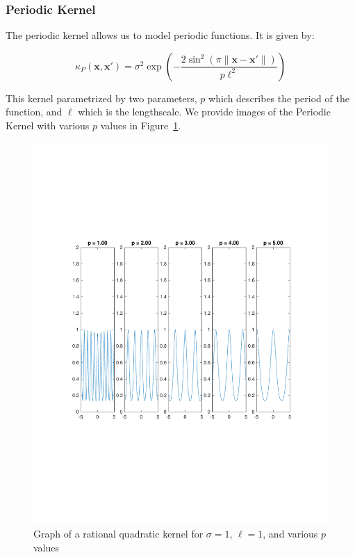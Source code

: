 \documentclass{article}
\newcommand{\bx}{\boldsymbol{x}}
\begin{document}
\subsubsection{Periodic Kernel}

The periodic kernel allows us to model periodic functions. It is given by: 

\[
  \kappa_{P}(\bx, \bx') = \sigma^{2} \exp\left(- \frac{2 \sin^{2}(\pi \|\bx - \bx'\|)}{p \ell^{2}}\right)
\]

This kernel parametrized by two parameters, $p$ which describes the period of the function, and $\ell$ which is the
lengthscale\cite{duvenaud_automatic_2014}.  We provide images of the Periodic Kernel with various $p$ values in
Figure~\ref{fig:periodic_kernel}.

\begin{figure}[H]
  \centering
  \caption{Graph of a rational quadratic kernel for $\sigma = 1$, $\ell = 1$, and various $p$ values}
  \label{fig:periodic_kernel}
  \includegraphics[trim={0 7.5cm 0 7cm},clip,keepaspectratio=true,scale=0.6]{periodic_kernel}
\end{figure}
\end{document}
